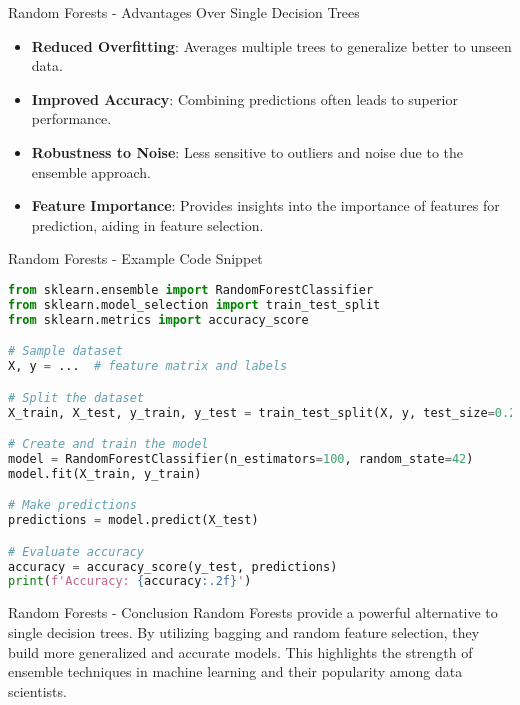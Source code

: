 \documentclass[aspectratio=169]{beamer}
\begin{document}
\begin{frame}[fragile]{Random Forests - Advantages Over Single Decision Trees}
    \begin{itemize}
        \item \textbf{Reduced Overfitting}: Averages multiple trees to generalize better to unseen data.
        
        \item \textbf{Improved Accuracy}: Combining predictions often leads to superior performance.
        
        \item \textbf{Robustness to Noise}: Less sensitive to outliers and noise due to the ensemble approach.
        
        \item \textbf{Feature Importance}: Provides insights into the importance of features for prediction, aiding in feature 
        selection.
    \end{itemize}
\end{frame}

\begin{frame}[fragile]{Random Forests - Example Code Snippet}
    \begin{lstlisting}[language=Python]
from sklearn.ensemble import RandomForestClassifier
from sklearn.model_selection import train_test_split
from sklearn.metrics import accuracy_score

# Sample dataset
X, y = ...  # feature matrix and labels

# Split the dataset
X_train, X_test, y_train, y_test = train_test_split(X, y, test_size=0.2, random_state=42)

# Create and train the model
model = RandomForestClassifier(n_estimators=100, random_state=42)
model.fit(X_train, y_train)

# Make predictions
predictions = model.predict(X_test)

# Evaluate accuracy
accuracy = accuracy_score(y_test, predictions)
print(f'Accuracy: {accuracy:.2f}')
    \end{lstlisting}
\end{frame}

\begin{frame}[fragile]{Random Forests - Conclusion}
    Random Forests provide a powerful alternative to single decision trees. By utilizing bagging and random feature 
    selection, they build more generalized and accurate models. This highlights the strength of ensemble techniques 
    in machine learning and their popularity among data scientists.
\end{frame}
\end{document}
